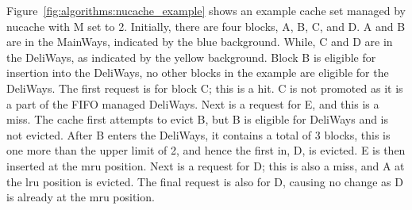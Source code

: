 Figure~\ref{fig:algorithms:nucache_example} shows an example cache set managed by \gls{nucache} with M set to 2.
Initially, there are four blocks, A, B, C, and D.
A and B are in the MainWays, indicated by the blue background.
While, C and D are in the DeliWays, as indicated by the yellow background.
Block B is eligible for insertion into the DeliWays, no other blocks in the example are eligible for the DeliWays.
The first request is for block C; this is a hit.
C is not promoted as it is a part of the FIFO managed DeliWays.
Next is a request for E, and this is a miss.
The cache first attempts to evict B, but B is eligible for DeliWays and is not evicted.
After B enters the DeliWays, it contains a total of 3 blocks, this is one more than the upper limit of 2, and hence the first in, D, is evicted.
E is then inserted at the \gls{mru} position.
Next is a request for D; this is also a miss, and A at the \gls{lru} position is evicted.
The final request is also for D, causing no change as D is already at the \gls{mru} position.

